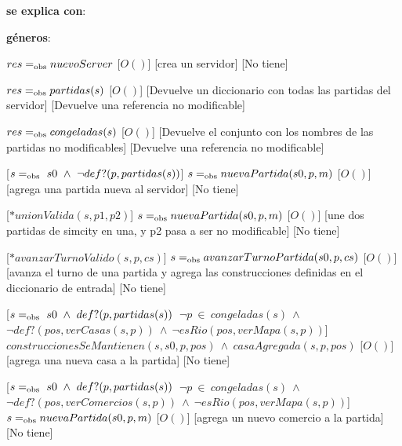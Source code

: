 \begin{Interfaz}
    \textbf{se explica con}: 

    \textbf{géneros}: 


    {$res =_{\mathrm{obs}} nuevoServer$}
    [$O()$]
    [crea un servidor]
    [No tiene]

    {$res =_{\mathrm{obs}} partidas(s)$}
    [$O()$]
    [Devuelve un diccionario con todas las partidas del servidor]
    [Devuelve una referencia no modificable]

    {$res =_{\mathrm{obs}} congeladas(s)$}
    [$O()$]
    [Devuelve el conjunto con los nombres de las partidas no modificables]
    [Devuelve una referencia no modificable]

    [$s =_{\mathrm{obs}}\ s0\ \wedge\ \lnot def?(p, partidas(s))$]
    {$s =_{\mathrm{obs}} nuevaPartida(s0, p, m)$}
    [$O()$]
    [agrega una partida nueva al servidor]
    [No tiene]

    [$*unionValida(s, p1, p2)$]
    {$s =_{\mathrm{obs}} nuevaPartida(s0, p, m)$}
    [$O()$]
    [une dos partidas de simcity en una, y p2 pasa a ser no modificable]
    [No tiene]

    [$*avanzarTurnoValido(s, p, cs)$]
    {$s =_{\mathrm{obs}} avanzarTurnoPartida(s0, p, cs)$}
    [$O()$]
    [avanza el turno de una partida y agrega las construcciones definidas en el diccionario de entrada]
    [No tiene]

    [$
        s \igobs\ s0\ \wedge\ def?(p, partidas(s))\ $\yluego$\ \lnot p\ \in\ congeladas(s)\ \wedge\ $\\$
        $\tab\tab$ \lnot def?(pos, verCasas(s, p))\ \wedge\ \lnot esRio(pos, verMapa(s, p))
    $]
    {$construccionesSeMantienen(s, s0, p, pos)\ \wedge\ casaAgregada(s, p, pos)$}
    [$O()$]
    [agrega una nueva casa a la partida]
    [No tiene]

    \pagebreak
    
    [$
        s \igobs\ s0\ \wedge\ def?(p, partidas(s))\ $\yluego$\ \lnot p\ \in\ congeladas(s)\ \wedge\ $\\$
        $\tab\tab$ \lnot def?(pos, verComercios(s, p))\ \wedge\ \lnot esRio(pos, verMapa(s, p))
    $]
    {$s =_{\mathrm{obs}} nuevaPartida(s0, p, m)$}
    [$O()$]
    [agrega un nuevo comercio a la partida]
    [No tiene]
    

\end{Interfaz}
